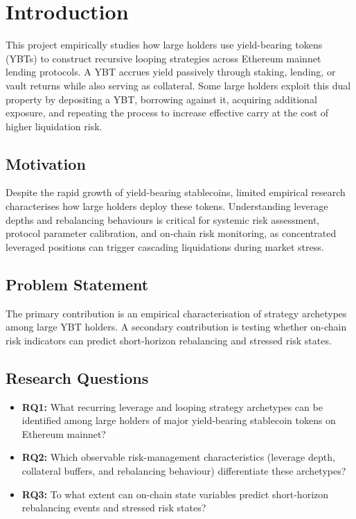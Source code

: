 \section{Introduction}
\label{sec:intro}

This project empirically studies how large holders use yield-bearing tokens (YBTs) to construct recursive looping strategies across Ethereum mainnet lending protocols. A YBT accrues yield passively through staking, lending, or vault returns while also serving as collateral. Some large holders exploit this dual property by depositing a YBT, borrowing against it, acquiring additional exposure, and repeating the process to increase effective carry at the cost of higher liquidation risk.

\subsection{Motivation}

Despite the rapid growth of yield-bearing stablecoins, limited empirical research characterises how large holders deploy these tokens. Understanding leverage depths and rebalancing behaviours is critical for systemic risk assessment, protocol parameter calibration, and on-chain risk monitoring, as concentrated leveraged positions can trigger cascading liquidations during market stress.

\subsection{Problem Statement}

The primary contribution is an empirical characterisation of strategy archetypes among large YBT holders. A secondary contribution is testing whether on-chain risk indicators can predict short-horizon rebalancing and stressed risk states.

\subsection{Research Questions}

\begin{itemize}
    \item \textbf{RQ1:} What recurring leverage and looping strategy archetypes can be identified among large holders of major yield-bearing stablecoin tokens on Ethereum mainnet?
    \item \textbf{RQ2:} Which observable risk-management characteristics (leverage depth, collateral buffers, and rebalancing behaviour) differentiate these archetypes?
    \item \textbf{RQ3:} To what extent can on-chain state variables predict short-horizon rebalancing events and stressed risk states?
\end{itemize}

